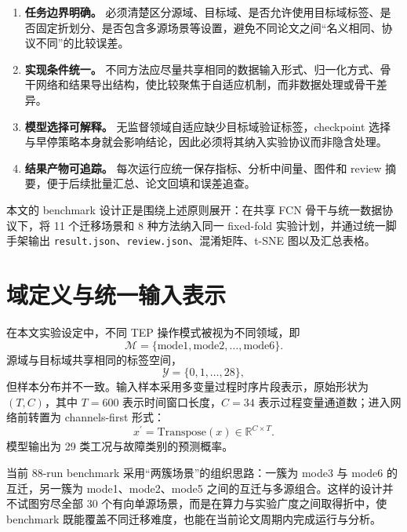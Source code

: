 \begin{enumerate}
\item \textbf{任务边界明确。} 必须清楚区分源域、目标域、是否允许使用目标域标签、是否固定折划分、是否包含多源场景等设置，避免不同论文之间“名义相同、协议不同”的比较误差。
\item \textbf{实现条件统一。} 不同方法应尽量共享相同的数据输入形式、归一化方式、骨干网络和结果导出结构，使比较聚焦于自适应机制，而非数据处理或骨干差异。
\item \textbf{模型选择可解释。} 无监督领域自适应缺少目标域验证标签，checkpoint 选择与早停策略本身就会影响结论，因此必须将其纳入实验协议而非隐含处理。
\item \textbf{结果产物可追踪。} 每次运行应统一保存指标、分析中间量、图件和 review 摘要，便于后续批量汇总、论文回填和误差追查。
\end{enumerate}

本文的 benchmark 设计正是围绕上述原则展开：在共享 FCN 骨干与统一数据协议下，将 11 个迁移场景和 8 种方法纳入同一 fixed-fold 实验计划，并通过统一脚手架输出 \texttt{result.json}、\texttt{review.json}、混淆矩阵、t-SNE 图以及汇总表格。

\section{域定义与统一输入表示}
在本文实验设定中，不同 TEP 操作模式被视为不同领域，即
\begin{equation}
\mathcal{M}=\{\mathrm{mode1},\mathrm{mode2},\ldots,\mathrm{mode6}\}.
\end{equation}
源域与目标域共享相同的标签空间，
\begin{equation}
\mathcal{Y}=\{0,1,\ldots,28\},
\end{equation}
但样本分布并不一致。输入样本采用多变量过程时序片段表示，原始形状为 $(T,C)$，其中 $T=600$ 表示时间窗口长度，$C=34$ 表示过程变量通道数；进入网络前转置为 channels-first 形式：
\begin{equation}
x^\prime=\mathrm{Transpose}(x)\in\mathbb{R}^{C\times T}.
\end{equation}
模型输出为 29 类工况与故障类别的预测概率。

当前 88-run benchmark 采用“两簇场景”的组织思路：一簇为 mode3 与 mode6 的互迁，另一簇为 mode1、mode2、mode5 之间的互迁与多源组合。这样的设计并不试图穷尽全部 30 个有向单源场景，而是在算力与实验广度之间取得折中，使 benchmark 既能覆盖不同迁移难度，也能在当前论文周期内完成运行与分析。

